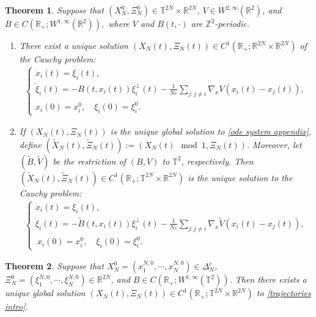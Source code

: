 \documentclass[10pt,a4paper]{amsart}
\newtheorem{thm}{Theorem}
\begin{document}
\begin{thm}\label{periodiccauchy lip thm}
Suppose that $(X_{N}^{0},\Xi_{N}^{0})\in \mathbb{T}^{2N}\times \mathbb{R}^{2N}$, 
$V\in W^{2,\infty}(\mathbb{R}^{2})$, and $B\in C(\mathbb{R}_{+};W^{1,\infty}(\mathbb{R}^{2})),$ 
where $V$ and $B(t,\cdot)$ are $\mathbb{Z}^{2}$-periodic.
\begin{enumerate}
\item[{\rm(i)}] There exist a unique solution $(X_{N}(t),\Xi_{N}(t))\in C^{1}(\mathbb{R}_{+};\mathbb{R}^{2N}\times \mathbb{R}^{2N})$ of the Cauchy problem{\rm :} 
\begin{align}
\begin{cases}
\dot x_{i}(t)=\xi_{i}(t),\\
\dot \xi_{i}(t)=-B(t,x_{i}(t))\xi_{i}^{\perp}(t)-\frac{1}{N\varepsilon}\underset{j:j\neq i}{\sum}\nabla_{x} V(x_{i}(t)-x_{j}(t)),\\
x_{i}(0)=x_{i}^{0}, \quad \xi_{i}(0)=\xi_{i}^{0}. 
\end{cases}
\label{ode system appendix}
\end{align}
\item[{\rm(ii)}] If $(X_{N}(t),\Xi_{N}(t))$ is the unique global solution to \eqref{ode system appendix}, define $(\widetilde{X}_{N}(t),\widetilde{\Xi}_{N}(t)):= (X_{N}(t)\mod 1,\Xi_{N}(t))$. Moreover, let $(\widetilde{B},\widetilde{V})$ be the restriction of $(B,V)$ 
to $\mathbb{T}^{2}$, respectively.  
Then $(\widetilde{X}_{N}(t),\widetilde{\Xi}_{N}(t))\in C^{1}(\mathbb{R}_{+};\mathbb{T}^{2N}\times \mathbb{R}^{2N})$  is the unique solution to the Cauchy problem{\rm:} 
\begin{align}
\begin{cases}
\dot x_{i}(t)=\xi_{i}(t),\\
\dot \xi_{i}(t)=-\widetilde{B}(t,x_{i}(t))\xi_{i}^{\perp}(t)-\frac{1}{N\varepsilon}\underset{j:j\neq i}{\sum}\nabla_{x} \widetilde{V}(x_{i}(t)-x_{j}(t)), \\
\ x_{i}(0)=x_{i}^{0},\quad \xi_{i}(0)=\xi_{i}^{0}. 
\end{cases}
\label{ode system appendix torus}
\end{align}
\end{enumerate}
\end{thm}

\begin{thm}
Suppose that $X_{N}^{0}=(x_{1}^{N,0},\cdots\!,x_{N}^{N,0})\in \Delta_{N}^{c}$,
$\Xi_{N}^{0}=(\xi_{1}^{N,0},\cdots\!,\xi_{N}^{N,0})\in \mathbb{R}^{2N}$, 
and $B\in C(\mathbb{R}_{+};W^{1,\infty}(\mathbb{T}^{2}))$. 
Then there exists a unique global solution $(X_{N}(t),\Xi_{N}(t))\in C^{1}(\mathbb{R}_{+}; \mathbb{T}^
{2N}\times \mathbb{R}^{2N})$ to \eqref{trajectories intro}.    
\end{thm}
\end{document}
